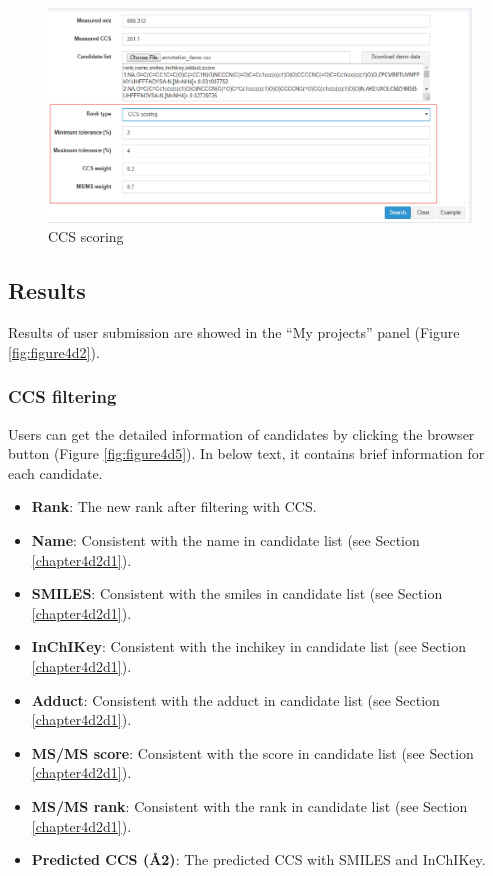 \documentclass[12pt,]{book}
\providecommand{\tightlist}{%
  \setlength{\itemsep}{0pt}\setlength{\parskip}{0pt}}
\theoremstyle{definition}
\theoremstyle{definition}
\theoremstyle{definition}
\theoremstyle{remark}
\begin{document}
\begin{figure}

{\centering \includegraphics{images/chapter4/figure4.4CCS_scoring} 

}

\caption{CCS scoring}\label{fig:figure4d4}
\end{figure}

\subsection{Results}\label{chapter4d2d3}

Results of user submission are showed in the ``My projects'' panel
(Figure \ref{fig:figure4d2}).

\subsubsection{CCS filtering}\label{chapter4d2d3d1}

Users can get the detailed information of candidates by clicking the
browser button (Figure \ref{fig:figure4d5}). In below text, it contains
brief information for each candidate.

\begin{itemize}
\tightlist
\item
  \textbf{Rank}: The new rank after filtering with CCS.
\item
  \textbf{Name}: Consistent with the name in candidate list (see Section
  \ref{chapter4d2d1}).
\item
  \textbf{SMILES}: Consistent with the smiles in candidate list (see
  Section \ref{chapter4d2d1}).
\item
  \textbf{InChIKey}: Consistent with the inchikey in candidate list (see
  Section \ref{chapter4d2d1}).
\item
  \textbf{Adduct}: Consistent with the adduct in candidate list (see
  Section \ref{chapter4d2d1}).
\item
  \textbf{MS/MS score}: Consistent with the score in candidate list (see
  Section \ref{chapter4d2d1}).
\item
  \textbf{MS/MS rank}: Consistent with the rank in candidate list (see
  Section \ref{chapter4d2d1}).
\item
  \textbf{Predicted CCS (Å2)}: The predicted CCS with SMILES and
  InChIKey.
\end{itemize}
\end{document}
